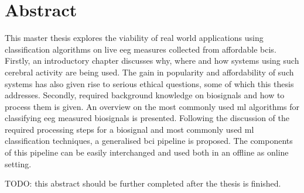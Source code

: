 
\chapter{Abstract}
\label{ch:abstract}

This master thesis explores the viability of real world applications using classification algorithms on live \gls{eeg} measures collected from affordable \glspl{bci}.
Firstly, an introductory chapter discusses why, where and how systems using such cerebral activity are being used.
The gain in popularity and affordability of such systems has also given rise to serious ethical questions, some of which this thesis addresses.
Secondly, required background knowledge on \glspl{biosignal} and how to process them is given.
An overview on the most commonly used \gls{ml} algorithms for classifying \gls{eeg} measured \glspl{biosignal} is presented.
Following the discussion of the required processing steps for a \gls{biosignal} and most commonly used \gls{ml} classification techniques, a generalised \gls{bci} pipeline is proposed.
The components of this pipeline can be easily interchanged and used both in an offline as online setting.

TODO: this abstract should be further completed after the thesis is finished.
